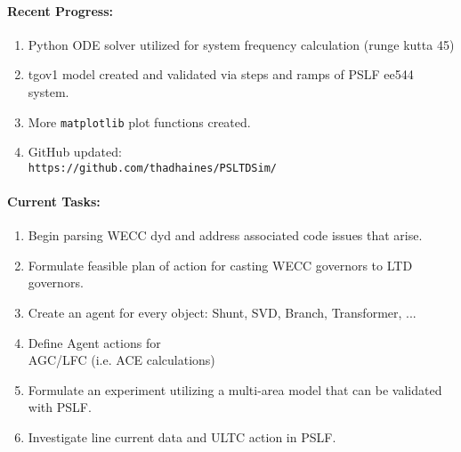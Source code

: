 \documentclass[12pt]{article}
\begin{document}
\begin{multicols}{2}

	\paragraph{Recent Progress:}
	\begin{enumerate}
		\item Python ODE solver utilized for system frequency calculation (runge kutta 45)

		\item tgov1 model created and validated via steps and ramps of PSLF ee544 system.
		
		\item More \verb|matplotlib| plot functions created.

		\item GitHub updated:\\
		\verb|https://github.com/thadhaines/PSLTDSim/|
		
	\end{enumerate}
\paragraph{Current Tasks:}
	\begin{enumerate}
	
		\item Begin parsing WECC dyd and address associated code issues that arise.

		\item Formulate feasible plan of action for casting WECC governors to LTD governors.
		
		\item Create an agent for every object: Shunt, SVD, Branch, Transformer, ...

		\item Define Agent actions for \\ AGC/LFC (i.e. ACE calculations)

		\item Formulate an experiment utilizing a multi-area model that can be validated with PSLF.

		\item Investigate line current data and ULTC action in PSLF.

		
		

	\end{enumerate}
\vfill\null
\columnbreak


\end{multicols}
\end{document}
